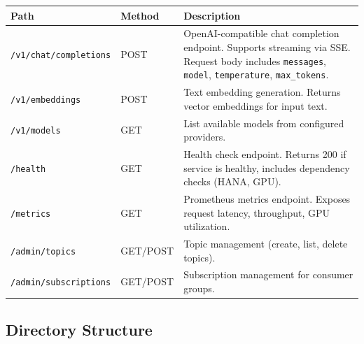 \documentclass[11pt,a4paper]{article}
\begin{document}
\begin{longtable}{@{}L{4.5cm}L{1.5cm}L{7.5cm}@{}}
\toprule
\textbf{Path} & \textbf{Method} & \textbf{Description} \\
\midrule
\endhead
\texttt{/v1/chat/completions} & POST & OpenAI-compatible chat completion endpoint. Supports streaming via SSE. Request body includes \texttt{messages}, \texttt{model}, \texttt{temperature}, \texttt{max\_tokens}. \\
\texttt{/v1/embeddings} & POST & Text embedding generation. Returns vector embeddings for input text. \\
\texttt{/v1/models} & GET & List available models from configured providers. \\
\texttt{/health} & GET & Health check endpoint. Returns 200 if service is healthy, includes dependency checks (HANA, GPU). \\
\texttt{/metrics} & GET & Prometheus metrics endpoint. Exposes request latency, throughput, GPU utilization. \\
\texttt{/admin/topics} & GET/POST & Topic management (create, list, delete topics). \\
\texttt{/admin/subscriptions} & GET/POST & Subscription management for consumer groups. \\
\bottomrule
\end{longtable}

\subsection{Directory Structure}
\end{document}
